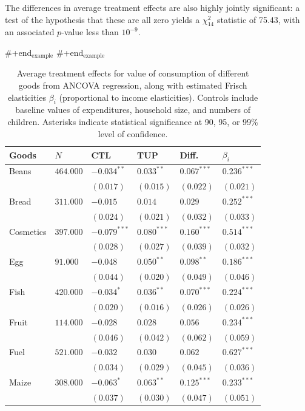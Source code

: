 \documentclass[11pt]{article}
\begin{document}
The differences in average treatment effects are also highly jointly
significant: a test of the hypothesis that these are all zero
yields a $\chi^2_{14}$ statistic of 75.43, with an associated
\(p\)-value less than $10^{-9}$.  

\#+end$_{\text{example}}$
\#+end$_{\text{example}}$

\begin{table}[htb]
\caption{\label{tab:goods_results}Average treatment effects for value of consumption of different goods from ANCOVA regression, along with estimated Frisch elasticities $\beta_i$ (proportional to income elasticities).  Controls include baseline values of expenditures, household size, and numbers of children.  Asterisks indicate statistical significance at 90, 95, or 99\% level of confidence.}
\centering
\begin{tabular}{llllll}
Goods & $N$ & CTL & TUP & Diff. & $\beta_i$\\
\hline
Beans & $464.000$ & $-0.034^{**}$ & $0.033^{**}$ & $0.067^{***}$ & $0.236^{***}$\\
 &  & $(0.017)$ & $(0.015)$ & $(0.022)$ & $(0.021)$\\
Bread & $311.000$ & $-0.015$ & $0.014$ & $0.029$ & $0.252^{***}$\\
 &  & $(0.024)$ & $(0.021)$ & $(0.032)$ & $(0.033)$\\
Cosmetics & $397.000$ & $-0.079^{***}$ & $0.080^{***}$ & $0.160^{***}$ & $0.514^{***}$\\
 &  & $(0.028)$ & $(0.027)$ & $(0.039)$ & $(0.032)$\\
Egg & $91.000$ & $-0.048$ & $0.050^{**}$ & $0.098^{**}$ & $0.186^{***}$\\
 &  & $(0.044)$ & $(0.020)$ & $(0.049)$ & $(0.046)$\\
Fish & $420.000$ & $-0.034^{*}$ & $0.036^{**}$ & $0.070^{***}$ & $0.224^{***}$\\
 &  & $(0.020)$ & $(0.016)$ & $(0.026)$ & $(0.026)$\\
Fruit & $114.000$ & $-0.028$ & $0.028$ & $0.056$ & $0.234^{***}$\\
 &  & $(0.046)$ & $(0.042)$ & $(0.062)$ & $(0.059)$\\
Fuel & $521.000$ & $-0.032$ & $0.030$ & $0.062$ & $0.627^{***}$\\
 &  & $(0.034)$ & $(0.029)$ & $(0.045)$ & $(0.036)$\\
Maize & $308.000$ & $-0.063^{*}$ & $0.063^{**}$ & $0.125^{***}$ & $0.233^{***}$\\
 &  & $(0.037)$ & $(0.030)$ & $(0.047)$ & $(0.051)$\\

\end{tabular}
\end{table}
\end{document}

